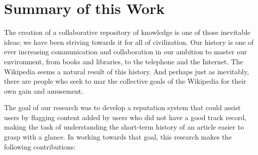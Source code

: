\section{Summary of this Work}

The creation of a collaborative repository of knowledge is
one of those inevitable ideas; we have been striving towards it
for all of civilization.
Our history is one of ever increasing communication and collaboration
in our ambition to master our environment, from books and libraries,
to the telephone and the Internet.
The Wikipedia seems a natural result of this history.
And perhaps just as inevitably, there are people who seek to
mar the collective goals of the Wikipedia for their own gain and amusement.

The goal of our research was to develop a reputation system
that could assist users by flagging content added by users who
did not have a good track record, making the task of understanding
the short-term history of an article easier to grasp with a glance.
In working towards that goal, this research makes the following contributions:

